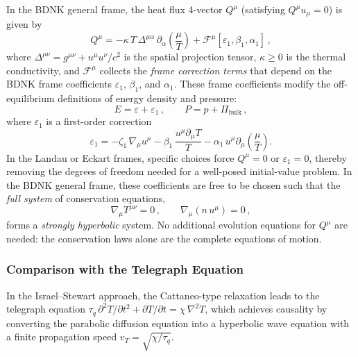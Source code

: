 In the BDNK general frame, the heat flux 4-vector $Q^{\mu}$
(satisfying $Q^{\mu}u_{\mu} = 0$) is given by
\begin{equation}
  Q^{\mu}
  = -\kappa\,T\,\Delta^{\mu\alpha}\,\partial_{\alpha}\!\left(\frac{\mu}{T}\right)
    + \mathcal{F}^{\mu}[\varepsilon_{1}, \beta_{1}, \alpha_{1}]\,,
  \label{eq:BDNK-heat}
\end{equation}
where $\Delta^{\mu\nu} = g^{\mu\nu} + u^{\mu}u^{\nu}/c^{2}$ is the
spatial projection tensor, $\kappa \ge 0$ is the thermal conductivity,
and $\mathcal{F}^{\mu}$ collects the \emph{frame correction terms}
that depend on the BDNK frame coefficients $\varepsilon_{1}$,
$\beta_{1}$, and $\alpha_{1}$.  These frame coefficients modify
the off-equilibrium definitions of energy density and pressure:
\begin{equation}
  E = \varepsilon + \varepsilon_{1}\,,\qquad
  P = p + \Pi_{\text{bulk}}\,,
  \label{eq:BDNK-EP}
\end{equation}
where $\varepsilon_{1}$ is a first-order correction
\begin{equation}
  \varepsilon_{1}
  = -\zeta_{1}\,\nabla_{\mu}u^{\mu}
    - \beta_{1}\,\frac{u^{\mu}\partial_{\mu}T}{T}
    - \alpha_{1}\,u^{\mu}\partial_{\mu}\!\left(\frac{\mu}{T}\right).
  \label{eq:eps1-BDNK}
\end{equation}
In the Landau or Eckart frames, specific choices force $Q^{\mu} = 0$
or $\varepsilon_{1} = 0$, thereby removing the degrees of freedom
needed for a well-posed initial-value problem.  In the BDNK general
frame, these coefficients are free to be chosen such that the
\emph{full system} of conservation equations,
\begin{equation}
  \nabla_{\mu}T^{\mu\nu} = 0\,,\qquad
  \nabla_{\mu}(n\,u^{\mu}) = 0\,,
  \label{eq:BDNK-conservation}
\end{equation}
forms a \emph{strongly hyperbolic} system.  No additional evolution
equations for $Q^{\mu}$ are needed: the conservation laws alone are
the complete equations of motion.

\subsubsection{Comparison with the Telegraph Equation}
In the Israel--Stewart approach, the Cattaneo-type relaxation leads
to the telegraph equation
$\tau_{q}\,\partial^{2}T/\partial t^{2} + \partial T/\partial t
= \chi\,\nabla^{2}T$, which achieves causality by converting the
parabolic diffusion equation into a hyperbolic wave equation with a
finite propagation speed $v_{T} = \sqrt{\chi/\tau_{q}}$.

